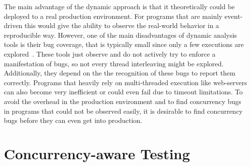 \documentclass[conference]{IEEEtran}
\begin{document}
The main advantage of the dynamic approach is that it theoretically could be deployed to a real production environment.
For programs that are mainly event-driven this would give the ability to observe the real-world behavior in a reproducible way.
However, one of the main disadvantages of dynamic analysis tools is their bug coverage, that is typically small since only a few executions are explored~\cite{qadeer2004kiss}.
These tools just observe and do not actively try to enforce a manifestation of bugs, so not every thread interleaving might be explored.
Additionally, they depend on the the recognition of these bugs to report them correctly.
Programs that heavily rely on multi-threaded execution like web-servers can also become very inefficient or could even fail due to timeout limitations.
To avoid the overhead in the production environment and to find concurrency bugs in programs that could not be observed easily, it is desirable to find concurrency bugs before they can even get into production.


\section{Concurrency-aware Testing}
\label{sct:testing}
\end{document}
